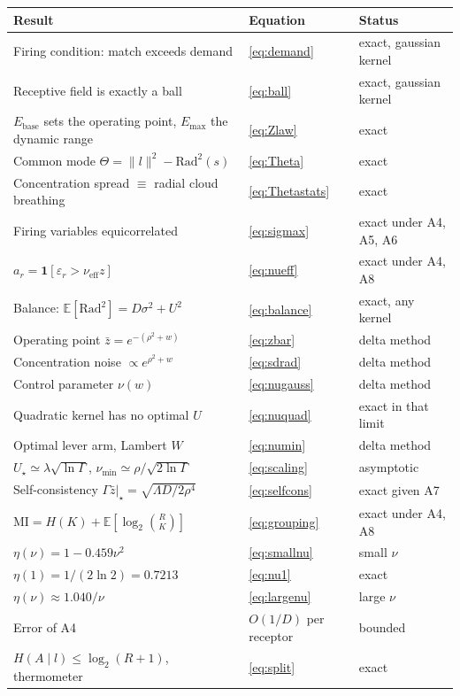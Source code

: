 \documentclass[11pt,a4paper]{article}
\newcommand{\EE}{\mathbb{E}}
\newcommand{\Ebase}{E_{\mathrm{base}}}
\newcommand{\Emax}{E_{\mathrm{max}}}
\newcommand{\nueff}{\nu_{\mathrm{eff}}}
\begin{document}
\begin{center}
\begin{tabular}{lll}
\toprule
Result & Equation & Status \\
\midrule
Firing condition: match exceeds demand & \eqref{eq:demand} & exact, gaussian kernel \\
Receptive field is exactly a ball & \eqref{eq:ball} & exact, gaussian kernel \\
$\Ebase$ sets the operating point, $\Emax$ the dynamic range & \eqref{eq:Zlaw} & exact \\
Common mode $\Theta=\|l\|^2-\mathrm{Rad}^2(s)$ & \eqref{eq:Theta} & exact \\
Concentration spread $\equiv$ radial cloud breathing & \eqref{eq:Thetastats} & exact \\
Firing variables equicorrelated & \eqref{eq:sigmax} & exact under A4, A5, A6 \\
$a_r=\mathbf 1[\varepsilon_r>\nueff z]$ & \eqref{eq:nueff} & exact under A4, A8 \\
Balance: $\EE[\mathrm{Rad}^2]=D\sigma^2+U^2$ & \eqref{eq:balance} & exact, any kernel \\
Operating point $\bar z=e^{-(\rho^2+w)}$ & \eqref{eq:zbar} & delta method \\
Concentration noise $\propto e^{\rho^2+w}$ & \eqref{eq:sdrad} & delta method \\
Control parameter $\nu(w)$ & \eqref{eq:nugauss} & delta method \\
Quadratic kernel has no optimal $U$ & \eqref{eq:nuquad} & exact in that limit \\
Optimal lever arm, Lambert $W$ & \eqref{eq:numin} & delta method \\
$U_\star\simeq\lambda\sqrt{\ln\Gamma}$, $\nu_{\min}\simeq\rho/\sqrt{2\ln\Gamma}$ & \eqref{eq:scaling} & asymptotic \\
Self-consistency $\Gamma\bar z|_\star=\sqrt{\Lambda D/2\rho^4}$ & \eqref{eq:selfcons} & exact given A7 \\
$\mathrm{MI}=H(K)+\EE[\log_2\binom{R}{K}]$ & \eqref{eq:grouping} & exact under A4, A8 \\
$\eta(\nu)=1-0.459\nu^2$ & \eqref{eq:smallnu} & small $\nu$ \\
$\eta(1)=1/(2\ln2)=0.7213$ & \eqref{eq:nu1} & exact \\
$\eta(\nu)\approx1.040/\nu$ & \eqref{eq:largenu} & large $\nu$ \\
Error of A4 & $O(1/D)$ per receptor & bounded \\
$H(A\mid l)\le\log_2(R+1)$, thermometer & \eqref{eq:split} & exact \\

\end{tabular}
\end{center}
\end{document}
